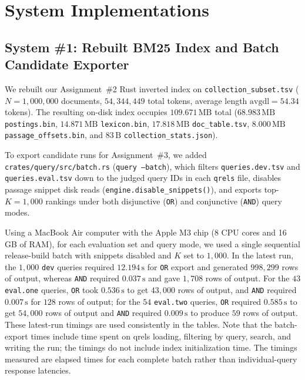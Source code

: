 \documentclass[11pt]{article}
\begin{document}
\section{System Implementations}

\subsection{System \#1: Rebuilt BM25 Index and Batch Candidate Exporter}
We rebuilt our Assignment~\#2 Rust inverted index on \texttt{collection\_subset.tsv} ($N = 1{,}000{,}000$ documents, $54{,}344{,}449$ total tokens, average length $\text{avgdl} = 54.34$ tokens). The resulting on-disk index occupies $109.671\,\text{MB}$ total ($68.983\,\text{MB}$ \texttt{postings.bin}, $14.871\,\text{MB}$ \texttt{lexicon.bin}, $17.818\,\text{MB}$ \texttt{doc\_table.tsv}, $8.000\,\text{MB}$ \texttt{passage\_offsets.bin}, and $83\,\text{B}$ \texttt{collection\_stats.json}).

To export candidate runs for Assignment~\#3, we added \texttt{crates/query/src/batch.rs} (\texttt{query --batch}), which filters \texttt{queries.dev.tsv} and \texttt{queries.eval.tsv} down to the judged query IDs in each \texttt{qrels} file, disables passage snippet disk reads (\texttt{engine.disable\_snippets()}), and exports top-$K=1{,}000$ rankings under both disjunctive (\texttt{OR}) and conjunctive (\texttt{AND}) query modes.

Using a MacBook Air computer with the Apple M3 chip (8 CPU cores and 16 GB of RAM), for each evaluation set and query mode, we used a single sequential release-build batch with snippets disabled and $K$ set to $1{,}000$. In the latest run, the $1{,}000$ \texttt{dev} queries required $12.194\,\text{s}$ for \texttt{OR} export and generated $998{,}299$ rows of output, whereas \texttt{AND} required $0.037\,\text{s}$ and gave $1{,}708$ rows of output. For the $43$ \texttt{eval.one} queries, \texttt{OR} took $0.536\,\text{s}$ to get $43{,}000$ rows of output, and \texttt{AND} required $0.007\,\text{s}$ for $128$ rows of output; for the $54$ \texttt{eval.two} queries, \texttt{OR} required $0.585\,\text{s}$ to get $54{,}000$ rows of output and \texttt{AND} required $0.009\,\text{s}$ to produce $59$ rows of output. These latest-run timings are used consistently in the tables. Note that the batch-export times include time spent on qrels loading, filtering by query, search, and writing the run; the timings do not include index initialization time. The timings measured are elapsed times for each complete batch rather than individual-query response latencies.
\end{document}
